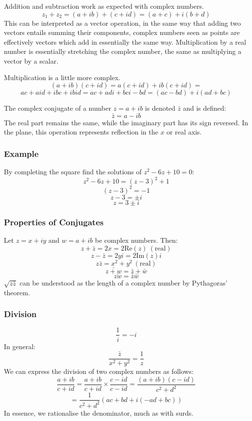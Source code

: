 \documentclass[12pt]{report}
\begin{document}
\begin{flushleft}
\bigskip
Addition and subtraction work as expected with complex numbers.
\[z_1 + z_2 = (a + ib) + (c + id) = (a + c) + i(b + d)\]
This can be interpreted as a vector operation, in the same way that adding two vectors
entails summing their components, complex numbers seen as points are effectively vectors
which add in essentially the same way. Multiplication by a real number is essentially stretching
the complex number, the same as multiplying a vector by a scalar.

\bigskip
Multiplication is a little more complex.
\[(a + ib)(c + id) = a(c +id) + ib(c + id) =\]
\[ac + aid + ibc + ibid = ac + adi + bci - bd = (ac -bd) + i(ad + bc)\]

The complex conjugate of a number \(z = a + ib\) is denoted \(\bar{z}\) and is defined:
\[\bar{z} = a - ib\]
The real part remains the same, while the imaginary part has its sign reversed. In the plane,
this operation represents reflection in the \(x\) or real axis.

\subsubsection*{Example}
By completing the square find the solutions of \(z^2 - 6z + 10 = 0\):
\[z^2 - 6z + 10 = (z - 3)^2 + 1\]
\[(z - 3)^2 = -1\]
\[z - 3 = \pm i\]
\[z = 3 \pm i\]

\subsubsection*{Properties of Conjugates}
Let \(z = x + iy\) and \(w = a + ib\) be complex numbers. Then:
\[z + \bar{z} = 2x = 2\mathrm{Re}(z)\:\mathrm{(real)}\]
\[z - \bar{z} = 2yi = 2 \mathrm{Im}(z)i\]
\[z\bar{z} = x^2 + y^2\:\mathrm{(real)}\]
\[\bar{z + w} = \bar{z} + \bar{w}\]
\[\bar{zw} = \bar{z}\bar{w}\]
\(\sqrt{z\bar{z}}\) can be understood as the length of a complex number by Pythagoras' theorem.

\subsubsection*{Division}
\[\frac{1}{i} = -i\]
In general:
\[\frac{\bar{z}}{x^2 + y^2} = \frac{1}{z}\]
We can express the division of two complex numbers as follows:
\[\frac{a + ib}{c + id} = \frac{a + ib}{c + id}\times\frac{c - id}{c - id} = \frac{(a + ib)(c - id)}{c^2 + d^2}\]
\[= \frac{1}{c^2 + d^2}(ac + bd + i(-ad + bc))\]
In essence, we rationalise the denominator, much as with surds.


\end{flushleft}
\end{document}

